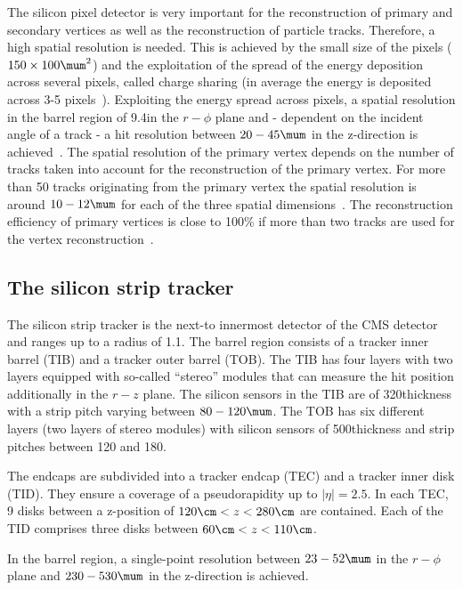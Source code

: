 The silicon pixel detector is very important for the reconstruction of primary and secondary vertices as well as the reconstruction of particle tracks.
Therefore, a high spatial resolution is needed.
This is achieved by the small size of the pixels ($ 150 \times 100 \mum^2$) and the exploitation of the spread of the energy deposition across several pixels, called charge sharing (in average the energy is deposited across 3-5 pixels~\cite{bib:TWIKI:PixelClusterSize}).
Exploiting the energy spread across pixels, a spatial resolution in the barrel region of 9.4\mum in the $r - \phi$ plane and - dependent on the incident angle of a track - a hit resolution between $20-45\mum$ in the z-direction is achieved~\cite{bib:CMS:tracking_8TeV}. 
The spatial resolution of the primary vertex depends on the number of tracks taken into account for the reconstruction of the primary vertex.
For more than 50 tracks originating from the primary vertex the spatial resolution is around $10-12\mum$ for each of the three spatial dimensions~\cite{bib:CMS:tracking_8TeV}.
The reconstruction efficiency of primary vertices is close to 100\% if more than two tracks are used for the vertex reconstruction~\cite{bib:CMS:tracking_8TeV}.

\subsection*{The silicon strip tracker}
The silicon strip tracker is the next-to innermost detector of the CMS detector and ranges up to a radius of 1.1\m.
The barrel region consists of a tracker inner barrel (TIB) and a tracker outer barrel (TOB).
The TIB has four layers with two layers equipped with so-called ``stereo'' modules that can measure the hit position additionally in the $r-z$ plane.
The silicon sensors in the TIB are of 320\mum thickness with a strip pitch varying between $80-120\mum$.
The TOB has six different layers (two layers of stereo modules) with silicon sensors of 500\mum thickness and strip pitches between 120 and 180\mum. 

The endcaps are subdivided into a tracker endcap (TEC) and a tracker inner disk (TID).
They ensure a coverage of a pseudorapidity up to $|\eta|=2.5$.
In each TEC, 9 disks between a z-position of $120\cm < z < 280\cm$ are contained.
Each of the TID comprises three disks between $60\cm < z < 110\cm$.

In the barrel region, a single-point resolution between $23 - 52\mum$ in the $r-\phi$ plane and $230 - 530\mum$  in the z-direction is achieved.

